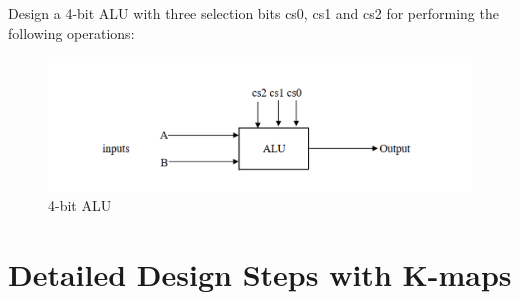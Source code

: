 \documentclass{article}
\begin{document}
Design a 4-bit ALU with three selection bits cs0, cs1 and cs2 for performing the following operations:\\

\begin{table}[h!]
\centering
{} %
\label{Table-question}
\caption{ Problem Specification}
\end{table}


\begin{figure}[h!]
\centering
\includegraphics[width=1\textwidth]{4BitALU_blockDiagram.png} %
\caption{ 4-bit ALU}
\label{fig-1}
\end{figure}


\pagebreak
\Large

\section{Detailed Design Steps with K-maps}
\end{document}
